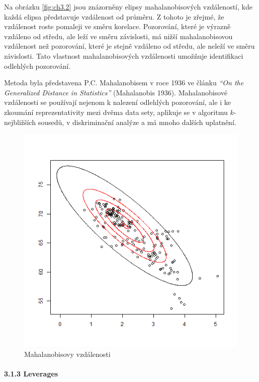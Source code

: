 \documentclass[12pt,]{article}
\let\oldparagraph\paragraph
\renewcommand{\paragraph}[1]{\oldparagraph{#1}\mbox{}}
\begin{document}
\qquad Na obrázku \ref{fig:ch3.2} jsou znázorněny elipsy
mahalanobisových vzdáleností, kde každá elipsa představuje vzdálenost od
průměru. Z tohoto je zřejmé, že vzdálenost roste pomaleji ve směru
korelace. Pozorování, které je výrazně vzdáleno od středu, ale leží ve
směru závislosti, má nižší mahalanobisovou vzdálenost než pozorování,
které je stejně vzdáleno od středu, ale neleží ve směru závislosti. Tato
vlastnost mahalanobisových vzdálenosti umožňuje identifikaci odlehlých
pozorování.

\qquad Metoda byla představena P.C. Mahalanobisem v roce 1936 ve článku
\emph{\enquote{On the Generalized Distance in Statistics}} (Mahalanobis
1936). Mahalanobisové vzdálenosti se používají nejenom k nalezení
odlehlých pozorování, ale i ke zkoumání reprezentativity mezi dvěma data
sety, aplikuje se v algoritmu \(k\)-nejbližších sousedů, v diskriminační
analýze a má mnoho dalších uplatnění.

\begin{figure}[H]

{\centering \includegraphics[width=0.65\linewidth]{fig/mahalanobis} 

}

\caption{\label{fig:ch3.2} Mahalanobisovy vzdálenosti}\label{fig:mbdist_img}
\end{figure}

\hypertarget{leverages}{\paragraph{3.1.3 Leverages}\label{leverages}}
\end{document}
